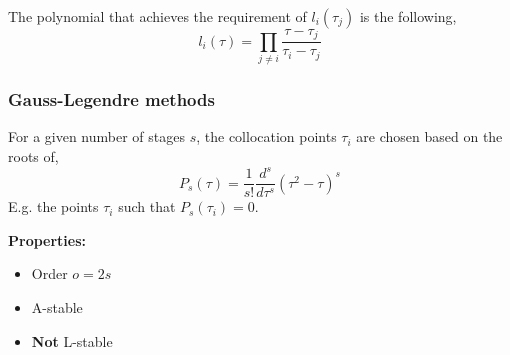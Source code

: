 The polynomial that achieves the requirement of $l_i(\tau_j)$ is the following,
$$ \label{eq:l_i_formula}
l_i(\tau)= \prod_{j\ne i} \frac{\tau-\tau_j}{\tau_i-\tau_j}
$$

\subsubsection{Gauss-Legendre methods}
For a given number of stages $s$, the collocation points $\tau_i$ are chosen based on the roots of,
\begin{equation}\label{eq:Gauss-Legendre}
P_s(\tau) = \frac{1}{s!} \frac{d^s}{d\tau^s}(\tau^2-\tau)^s
\end{equation}
E.g. the points $\tau_i$ such that $P_s(\tau_i)=0$. 

\textbf{Properties:}\\
\begin{itemize}
    \item Order $o=2s$
    \item A-stable
    \item \textbf{Not} L-stable
\end{itemize}

